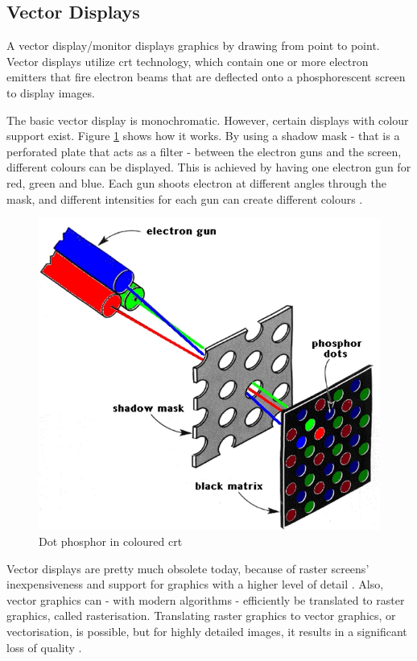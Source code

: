 \subsection{Vector Displays}
A vector display/monitor displays graphics by drawing from point to point.
Vector displays utilize \gls{crt} technology, which contain one or more electron emitters that fire electron beams that are deflected onto a phosphorescent screen to display images.

The basic vector display is monochromatic.
However, certain displays with colour support exist.
Figure \ref{fig:color_crt} shows how it works.
By using a shadow mask - that is a perforated plate that acts as a filter - between the electron guns and the screen, different colours can be displayed.
This is achieved by having one electron gun for red, green and blue.
Each gun shoots electron at different angles through the mask, and different intensities for each gun can create different colours \cite{monitors}.

\begin{figure}
	\centering
	\includegraphics[width=0.5 \textwidth]{images/color_crt.jpg}
	\caption{Dot phosphor in coloured \gls{crt} \cite{monitors}}
	\label{fig:color_crt}
\end{figure}

Vector displays are pretty much obsolete today, because of raster screens' inexpensiveness and support for graphics with a higher level of detail \cite{lcd-vs-crt}.
Also, vector graphics can - with modern algorithms - efficiently be translated to raster graphics, called rasterisation.
Translating raster graphics to vector graphics, or vectorisation, is possible, but for highly detailed images, it results in a significant loss of quality \cite{vectorisation}.
